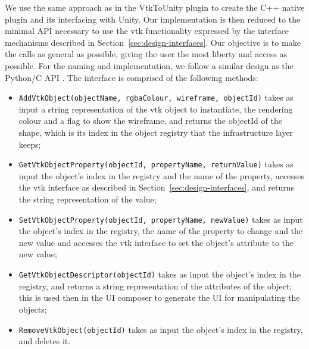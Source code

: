 
We use the same approach as in the VtkToUnity plugin to create the C++ native plugin and its interfacing with Unity. Our implementation is then reduced to the minimal API necessary to use the \acrshort{vtk} functionality expressed by the interface mechanisms described in Section~\ref{sec:design-interfaces}. Our objective is to make the calls as general as possible, giving the user the most liberty and access as possible. For the naming and implementation, we follow a similar design as the Python/C API \cite{python_c_api}. The interface is comprised of the following methods:

\begin{itemize}[leftmargin=1.5truecm]
    \setlength{\itemindent}{-1truecm}
    \item[] \verb|AddVtkObject(objectName, rgbaColour, wireframe, objectId)| takes as input a string representation of the \acrshort{vtk} object to instantiate, the rendering colour and a flag to show the wireframe, and returns the objectId of the shape, which is its index in the object registry that the infrastructure layer keeps;
    \item[] \verb|GetVtkObjectProperty(objectId, propertyName, returnValue)| takes as input the object's index in the registry and the name of the property, accesses the \acrshort{vtk} interface as described in Section~\ref{sec:design-interfaces}, and returns the string representation of the value;
    \item[] \verb|SetVtkObjectProperty(objectId, propertyName, newValue)| takes as input the object's index in the registry, the name of the property to change and the new value and accesses the \acrshort{vtk} interface to set the object's attribute to the new value;
    \item[] \verb|GetVtkObjectDescriptor(objectId)| takes as input the object's index in the registry, and returns a string representation of the attributes of the object; this is used then in the UI composer to generate the UI for manipulating the objects;
    \item[] \verb|RemoveVtkObject(objectId)| takes as input the object's index in the registry, and deletes it.
\end{itemize}

